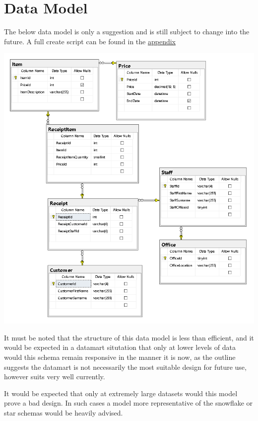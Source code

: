 \documentclass{article}
\begin{document}
    \newpage
    \section{Data Model}
    The below data model is only a suggestion and is still subject to change into the future. A full create script can be found in the \hyperref[sec:Appendix]{\color{blue}appendix}
        \begin{center}
            \includegraphics[width=\textwidth]{Images/Suggested_Schema.PNG}
        \end{center}
    It must be noted that the structure of this data model is 
    less than efficient, and it would be expected in a datamart
    situtation that only at lower levels of data would this schema
    remain responsive in the manner it is now, as the outline
    suggests the datamart is not necessarily the most suitable
    design for future use, however suits very well currently.
    \par
    It would be expected that only at extremely large datasets
    would this model prove a bad design. In such cases a model 
    more representative of the snowflake or star schemas would be
    heavily advised.

    \newpage
\end{document}
